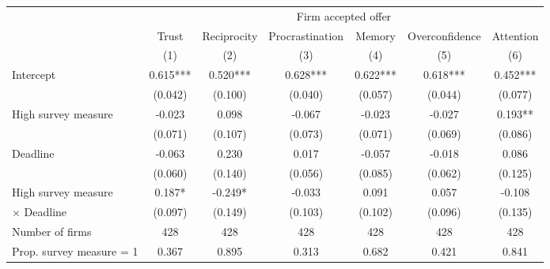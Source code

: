 \begin{tabular}[t]{lcccccc}
\toprule
& \multicolumn{6}{c}{Firm accepted offer} \\
\cmidrule(lr){2-7} 

  & Trust & Reciprocity & Procrastination & Memory & Overconfidence & Attention\\
& (1) & (2) & (3) & (4) & (5) & (6)\\
\midrule
Intercept & 0.615*** & 0.520*** & 0.628*** & 0.622*** & 0.618*** & 0.452***\\
 & (0.042) & (0.100) & (0.040) & (0.057) & (0.044) & (0.077)\\
High survey measure & -0.023 & 0.098 & -0.067 & -0.023 & -0.027 & 0.193**\\
 & (0.071) & (0.107) & (0.073) & (0.071) & (0.069) & (0.086)\\
Deadline & -0.063 & 0.230 & 0.017 & -0.057 & -0.018 & 0.086\\
 & (0.060) & (0.140) & (0.056) & (0.085) & (0.062) & (0.125)\\
High survey measure & 0.187* & -0.249* & -0.033 & 0.091 & 0.057 & -0.108\\
 \quad $\times$ Deadline & (0.097) & (0.149) & (0.103) & (0.102) & (0.096) & (0.135)\\
\midrule
Number of firms & 428 & 428 & 428 & 428 & 428 & 428\\
Prop. survey measure = 1 & 0.367 & 0.895 & 0.313 & 0.682 & 0.421 & 0.841\\
\bottomrule
\end{tabular}

